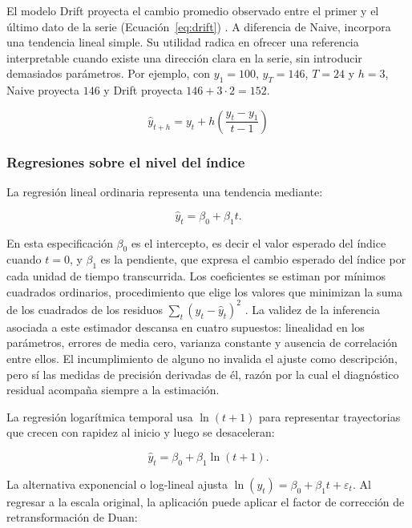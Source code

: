 \documentclass[12pt,letterpaper]{article}
\providecommand{\parencite}{\citep}
\begin{document}
El modelo Drift proyecta el cambio promedio observado entre el primer y el último dato de la serie (Ecuación~\ref{eq:drift}) \parencite{hyndman2021fpp3}. A diferencia de Naive, incorpora una tendencia lineal simple. Su utilidad radica en ofrecer una referencia interpretable cuando existe una dirección clara en la serie, sin introducir demasiados parámetros. Por ejemplo, con $y_1=100$, $y_T=146$, $T=24$ y $h=3$, Naive proyecta $146$ y Drift proyecta $146+3\cdot 2=152$.

\begin{equation}
\hat{y}_{t+h}=y_t+h\left(\frac{y_t-y_1}{t-1}\right)
\label{eq:drift}
\end{equation}

\subsubsection{Regresiones sobre el nivel del índice}

La regresión lineal ordinaria representa una tendencia mediante:

\begin{equation}
\hat{y}_t=\beta_0+\beta_1t.
\end{equation}

En esta especificación \(\beta_0\) es el intercepto, es decir el valor esperado del índice cuando \(t=0\), y \(\beta_1\) es la pendiente, que expresa el cambio esperado del índice por cada unidad de tiempo transcurrida. Los coeficientes se estiman por mínimos cuadrados ordinarios, procedimiento que elige los valores que minimizan la suma de los cuadrados de los residuos \(\sum_t (y_t-\hat{y}_t)^2\) \parencite{montgomery2012introduccion}. La validez de la inferencia asociada a este estimador descansa en cuatro supuestos: linealidad en los parámetros, errores de media cero, varianza constante y ausencia de correlación entre ellos. El incumplimiento de alguno no invalida el ajuste como descripción, pero sí las medidas de precisión derivadas de él, razón por la cual el diagnóstico residual acompaña siempre a la estimación.

La regresión logarítmica temporal usa \(\ln(t+1)\) para representar trayectorias que crecen con rapidez al inicio y luego se desaceleran:

\begin{equation}
\hat{y}_t=\beta_0+\beta_1\ln(t+1).
\end{equation}

La alternativa exponencial o log-lineal ajusta \(\ln(y_t)=\beta_0+\beta_1t+\varepsilon_t\). Al regresar a la escala original, la aplicación puede aplicar el factor de corrección de retransformación de Duan:
\end{document}
